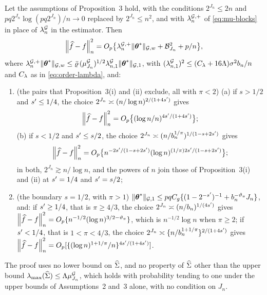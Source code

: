 \begin{proposition}
\label{prop:slow-ceiling}
Let the assumptions of Proposition~3 hold, with the conditions $2^{J_n} \le 2n$
and $pq2^{J_n}\log(pq2^{J_n})/n \to 0$ replaced by $2^{J_n} \le n^{2}$, and
with $\lambda^{\mathcal{G},+}_{n}$ of \eqref{eq:mu-blocks} in place of $\lambda^{\mathcal{G}}_{n}$ in the estimator.
Then
\[
  \left\lVert \widehat{f}-f \right\rVert_{n}^{2} = O_p\bigl\{\lambda^{\mathcal{G},+}_{n}\lVert \boldsymbol{\theta}^{*}\rVert_{\mathcal{G},w} +
  \mathcal{B}_{J_n}^{2} + p/n\bigr\},
\]
where $\lambda^{\mathcal{G},+}_{n}\lVert \boldsymbol{\theta}^{*}\rVert_{\mathcal{G},w} \le \bar\varrho\,(\mu^{\mathcal{G}}_{J_n})^{1/2}
\lambda^{\mathcal{G}}_{n,1}\lVert \boldsymbol{\theta}^{*}\rVert_{\mathcal{G},1}$,
with $(\lambda^{\mathcal{G}}_{n,1})^{2} \le (C_{\lambda} + 16\Lambda)\sigma^{2}b_{n}/n$ and $C_{\lambda}$
as in \eqref{eq:order-lambda}, and:
\begin{enumerate}
\item[(iii)] (the pairs that Proposition~3(i) and (ii) exclude, all with
$\pi < 2$) (a) if $s > 1/2$ and $s' \le 1/4$, the choice
$2^{J_n} \asymp (n/\log n)^{2/(1+4s')}$ gives
\[
  \left\lVert \widehat{f}-f \right\rVert_{n}^{2} = O_p\bigl\{(\log n/n)^{4s'/(1+4s')}\bigr\};
\]
(b) if $s < 1/2$ and $s' \le s/2$, the choice
$2^{J_n} \asymp (n/b_{n}^{1/\pi})^{1/(1-s+2s')}$ gives
\[
  \left\lVert \widehat{f}-f \right\rVert_{n}^{2}
  = O_p\bigl\{n^{-2s'/(1-s+2s')}
  (\log n)^{(1/\pi)2s'/(1-s+2s')}\bigr\};
\]
in both, $2^{J_n} \gtrsim n/\log n$, and the powers of $n$ join those of
Proposition~3(i) and (ii) at $s' = 1/4$ and $s' = s/2$;
\item[(iv)] (the boundary $s = 1/2$, with $\pi > 1$)
$\lVert \boldsymbol{\theta}^{*}\rVert_{\mathcal{G},1} \le pqC_g\{(1-2^{-s'})^{-1} + b_{n}^{-\vartheta_{\pi}}J_n\}$,
and: if $s' \ge 1/4$, that is $\pi \ge 4/3$, the choice
$2^{J_n} \asymp (n/b_{n})^{1/(4s')}$ gives
$\left\lVert \widehat{f}-f \right\rVert_{n}^{2} = O_p\{n^{-1/2}(\log n)^{3/2-\vartheta_{\pi}}\}$,
which is $n^{-1/2}\log n$ when $\pi \ge 2$; if $s' < 1/4$, that is
$1 < \pi < 4/3$, the choice
$2^{J_n} \asymp \{n/b_{n}^{1+1/\pi}\}^{2/(1+4s')}$ gives
$\left\lVert \widehat{f}-f \right\rVert_{n}^{2} =
O_p[\{(\log n)^{1+1/\pi}/n\}^{4s'/(1+4s')}]$.
\end{enumerate}
The proof uses no lower bound on $\widehat{\Sigma}$, and no property of $\widehat{\Sigma}$
other than the upper bound $\lambda_{\max}(\widehat{\Sigma}) \le \Lambda\mu^{\mathcal{G}}_{J_n}$, which
holds with probability tending to one under the upper bounds of Assumptions~2
and~3 alone, with no condition on $J_n$.
\end{proposition}

